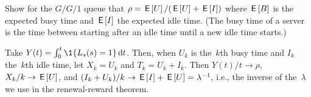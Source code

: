 \documentclass[queueing-book.tex]{subfiles}
\begin{document}
\begin{exercise}\label{ex:57}
Show for the $G/G/1$ queue that $\rho = \,\mathsf{E}\left[U\right] / (\,\mathsf{E}\left[U\right] + \,\mathsf{E}\left[I\right])$ where $\,\mathsf{E}\left[B\right]$ is the expected busy time and $\,\mathsf{E}\left[I\right]$ the expected idle time.
(The busy time of a server is the time between starting after an idle time until a new idle time starts.)
\begin{solution}
Take $Y(t) = \int_0^t \1{\Ls(s)=1} \d t$. Then, when $U_{k}$ is the~$k$th busy time and $I_{k}$ the~$k$th idle time, let $X_{k} = U_{k}$ and $T_{k} = U_k + I_{k}$.
Then $Y(t)/ t\to\rho$, $X_k/k \to \,\mathsf{E}\left[U\right]$, and $(I_k + U_k)/k \to \,\mathsf{E}\left[I\right] + \,\mathsf{E}\left[U\right] = \lambda^{-1}$, i.e., the inverse of the~$\lambda$ we use in the renewal-reward theorem.
\end{solution}
\end{exercise}



\end{document}
